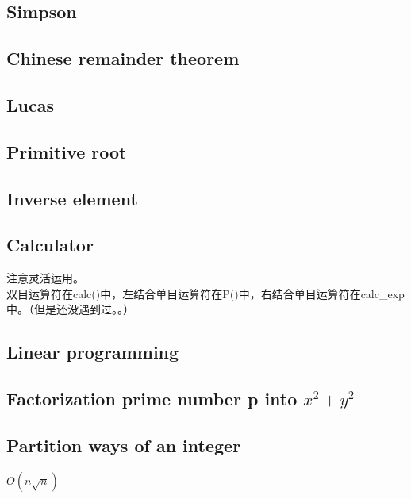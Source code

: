 \subsection{Simpson}


\subsection{Chinese remainder theorem}


\subsection{Lucas}


\subsection{Primitive root}

\subsection{Inverse element}


\subsection{Calculator}
注意灵活运用。\\
双目运算符在calc()中，左结合单目运算符在P()中，右结合单目运算符在calc\_exp中。（但是还没遇到过。。）\\


\subsection{Linear programming}


\subsection{Factorization prime number p into $x^2+y^2$}


\subsection{Partition ways of an integer}
$O(n\sqrt{n})$


